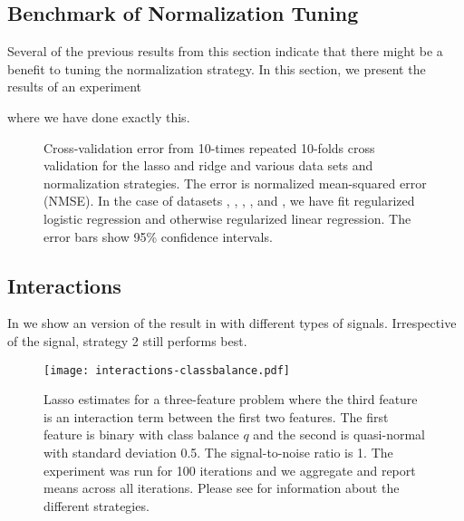 \subsection{Benchmark of Normalization Tuning} \label{sec:normalization-tuning}

Several of the previous results from this section indicate that there might be a benefit to
tuning the normalization strategy. In this section, we present the results of an experiment

where we have done exactly this.

\begin{figure*}[htpb]
  \centering
  \caption{%
    Cross-validation error from 10-times repeated 10-folds cross validation for the lasso and ridge
    and various data sets and normalization strategies. The error is normalized mean-squared
    error (NMSE). In the case of datasets , , , ,
    and , we have fit regularized logistic regression and
    otherwise regularized linear regression. The error bars show 95\% confidence intervals.
  }
\end{figure*}

\subsection{Interactions}%
\label{sec:additional-experiments-interactions}

In  we show an version of the result in 
with different types of signals. Irrespective of the signal, strategy 2 still performs
best.

\begin{figure}[htpb]
  \centering
  \texttt{[image: interactions-classbalance.pdf]}
  \caption{%
    Lasso estimates for a three-feature problem where the third feature is an
    interaction term between the first two features. The first feature is
    binary with class balance \(q\) and the second is quasi-normal with
    standard deviation 0.5. The signal-to-noise ratio is 1. The experiment was
    run for 100 iterations and we aggregate and report means across all
    iterations. Please see  for information
    about the different strategies.
  }
  \label{fig:interactions-full}
\end{figure}

